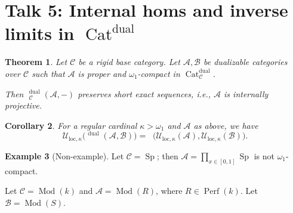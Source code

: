 \documentclass[draft]{amsart}
\newcommand{\ul}[1]{\underline{#1}}
\newcommand{\cat}[1]{\mathcal{#1}}
\newcommand{\blank}{-} %
\DeclareMathOperator{\iHom}{\ul{Hom}}
\DeclareMathOperator{\Cat}{Cat}
\DeclareMathOperator{\Sp}{Sp}
\DeclareMathOperator{\Mod}{Mod}
\DeclareMathOperator{\Perf}{Perf}
\newtheorem{thm}{Theorem}[section]
\newtheorem{cor}[thm]{Corollary}
\theoremstyle{definition}
\newtheorem{ex}[thm]{Example}
\begin{document}
\section{Talk 5: Internal homs and inverse limits in \texorpdfstring{$\Cat^{\mathrm{dual}}$}{Catdual}}


\begin{thm}
Let $\cat C$ be a rigid  base category. Let $\cat A, \cat B$ be dualizable categories over $\cat C$ such that $\cat A$ is proper and $\omega_1$-compact in $\Cat^{\mathrm{dual}}_{\cat C}$.

Then $\iHom^{\mathrm{dual}}_{\cat C}(\cat A,\blank)$ preserves short exact sequences, i.e., $\cat A$ is internally projective.
\end{thm}

\begin{cor}
For a regular cardinal $\kappa > \omega_1$ and $\cat A$ as above, we have
\[
\cat U_{\mathrm{loc},\kappa}\bigl(\iHom^{\mathrm{dual}}(\cat A, \cat B)\bigr) = \iHom\bigl(\cat U_{\mathrm{loc},\kappa}(\cat A), \cat U_{\mathrm{loc},\kappa}(\cat B)\bigr).
\]
\end{cor}

\begin{ex}[Non-example]
Let $\cat C = \Sp$; then $\cat A = \prod_{x\in [0,1]} \Sp$ is not $\omega_1$-compact.
\end{ex}

Let $\cat C = \Mod(k)$ and $\cat A = \Mod(R)$, where $R\in \Perf(k)$. Let $\cat B= \Mod(S)$.
\end{document}
